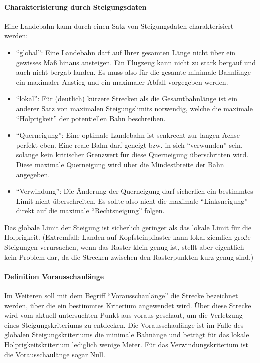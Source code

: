 \documentclass[
11pt, %
a4paper, %
oneside, %
pdfspacing, %
headinclude,
BCOR5mm, %
ngerman, %
bibtotocnumbered,
]{scrartcl}
\begin{document}
	\paragraph{Charakterisierung durch Steigungsdaten}
	Eine Landebahn kann durch einen Satz von Steigungsdaten charakterisiert werden:
	\begin{itemize}
		\item "`global"': Eine Landebahn darf auf Ihrer gesamten Länge nicht über ein gewisses Maß hinaus ansteigen. Ein Flugzeug kann nicht zu stark bergauf und auch nicht bergab landen. Es muss also für die gesamte minimale Bahnlänge ein maximaler Anstieg und ein maximaler Abfall vorgegeben werden.
		\item "`lokal"': Für (deutlich) kürzere Strecken als die Gesamtbahnlänge ist ein anderer Satz von maximalen Steigungslimits notwendig, welche die maximale "`Holprigkeit"' der potentiellen Bahn beschreiben.
		\item "`Querneigung"': Eine optimale Landebahn ist senkrecht zur langen Achse perfekt eben. Eine reale Bahn darf geneigt bzw. in sich "`verwunden"' sein, solange kein kritischer Grenzwert für diese Querneigung überschritten wird. Diese maximale Querneigung wird über die Mindestbreite der Bahn angegeben.
		\item "`Verwindung"': Die Änderung der Querneigung darf sicherlich ein bestimmtes Limit nicht überschreiten. Es sollte also nicht die maximale "`Linksneigung"' direkt auf die maximale "`Rechtsneigung"' folgen.
	\end{itemize}

	Das globale Limit der Steigung ist sicherlich geringer als das lokale Limit für die Holprigkeit. (Extremfall: Landen auf Kopfsteinpflaster kann lokal ziemlich große Steigungen verursachen, wenn das Raster klein genug ist, stellt aber eigentlich kein Problem dar, da die Strecken zwischen den Rasterpunkten kurz genug sind.)
	
	\paragraph{Definition Vorausschaulänge} Im Weiteren soll mit dem Begriff "`Vorausschaulänge"' die Strecke bezeichnet werden, über die ein bestimmtes Kriterium angewendet wird. Über diese Strecke wird vom aktuell untersuchten Punkt aus voraus geschaut, um die Verletzung eines Steigungskriteriums zu entdecken. Die Vorausschaulänge ist im Falle des globalen Steigungskriteriums die minimale Bahnänge und beträgt für das lokale Holprigkeitskriterium lediglich wenige Meter. Für das Verwindungskriterium ist die Vorausschaulänge sogar Null.
	
\end{document}
